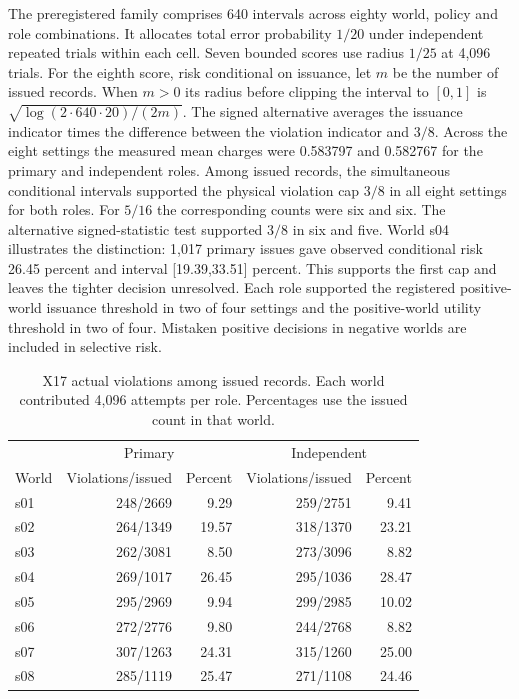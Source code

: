 The preregistered family comprises 640 intervals across eighty world, policy and role combinations. It allocates total error probability $1/20$ under independent repeated trials within each cell. Seven bounded scores use radius $1/25$ at 4,096 trials. For the eighth score, risk conditional on issuance, let $m$ be the number of issued records. When $m>0$ its radius before clipping the interval to $[0,1]$ is $\sqrt{\log(2\cdot640\cdot20)/(2m)}$. The signed alternative averages the issuance indicator times the difference between the violation indicator and $3/8$. Across the eight settings the measured mean charges were 0.583797 and 0.582767 for the primary and independent roles. Among issued records, the simultaneous conditional intervals supported the physical violation cap $3/8$ in all eight settings for both roles. For $5/16$ the corresponding counts were six and six. The alternative signed-statistic test supported $3/8$ in six and five. World s04 illustrates the distinction: 1,017 primary issues gave observed conditional risk 26.45 percent and interval [19.39,33.51] percent. This supports the first cap and leaves the tighter decision unresolved. Each role supported the registered positive-world issuance threshold in two of four settings and the positive-world utility threshold in two of four. Mistaken positive decisions in negative worlds are included in selective risk.

\begin{table}[htbp]\centering\small
\caption{X17 actual violations among issued records. Each world contributed 4,096 attempts per role. Percentages use the issued count in that world.}\label{tab:x17issued}
\begin{tabular}{lrrrr}\toprule
& \multicolumn{2}{c}{Primary} & \multicolumn{2}{c}{Independent}\\
World & Violations/issued & Percent & Violations/issued & Percent\\\midrule
s01 & 248/2669 & 9.29 & 259/2751 & 9.41 \\
s02 & 264/1349 & 19.57 & 318/1370 & 23.21 \\
s03 & 262/3081 & 8.50 & 273/3096 & 8.82 \\
s04 & 269/1017 & 26.45 & 295/1036 & 28.47 \\
s05 & 295/2969 & 9.94 & 299/2985 & 10.02 \\
s06 & 272/2776 & 9.80 & 244/2768 & 8.82 \\
s07 & 307/1263 & 24.31 & 315/1260 & 25.00 \\
s08 & 285/1119 & 25.47 & 271/1108 & 24.46 \\
\bottomrule\end{tabular}\end{table}

